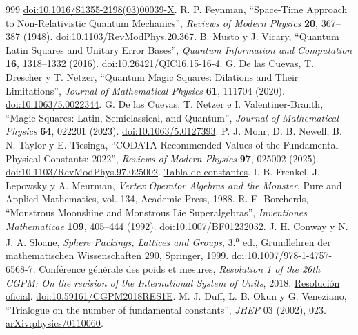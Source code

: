 \begin{thebibliography}{999}
\href{https://doi.org/10.1016/S1355-2198(03)00039-X}{doi:10.1016/S1355-2198(03)00039-X}.
 R. P. Feynman, ``Space-Time Approach to Non-Relativistic Quantum Mechanics'', \emph{Reviews of Modern Physics} \textbf{20}, 367--387 (1948). \href{https://doi.org/10.1103/RevModPhys.20.367}{doi:10.1103/RevModPhys.20.367}.
 B. Musto y J. Vicary, ``Quantum Latin Squares and Unitary Error Bases'', \emph{Quantum Information and Computation} \textbf{16}, 1318--1332 (2016). \href{https://doi.org/10.26421/QIC16.15-16-4}{doi:10.26421/QIC16.15-16-4}.
 G. De las Cuevas, T. Drescher y T. Netzer, ``Quantum Magic Squares: Dilations and Their Limitations'', \emph{Journal of Mathematical Physics} \textbf{61}, 111704 (2020). \href{https://doi.org/10.1063/5.0022344}{doi:10.1063/5.0022344}.
 G. De las Cuevas, T. Netzer e I. Valentiner-Branth, ``Magic Squares: Latin, Semiclassical, and Quantum'', \emph{Journal of Mathematical Physics} \textbf{64}, 022201 (2023). \href{https://doi.org/10.1063/5.0127393}{doi:10.1063/5.0127393}.
 P. J. Mohr, D. B. Newell, B. N. Taylor y E. Tiesinga, ``CODATA Recommended Values of the Fundamental Physical Constants: 2022'', \emph{Reviews of Modern Physics} \textbf{97}, 025002 (2025). \href{https://doi.org/10.1103/RevModPhys.97.025002}{doi:10.1103/RevModPhys.97.025002}. \href{https://physics.nist.gov/cuu/Constants/Table/allascii.txt}{Tabla de constantes}.
 I. B. Frenkel, J. Lepowsky y A. Meurman, \emph{Vertex Operator Algebras and the Monster}, Pure and Applied Mathematics, vol. 134, Academic Press, 1988.
 R. E. Borcherds, ``Monstrous Moonshine and Monstrous Lie Superalgebras'', \emph{Inventiones Mathematicae} \textbf{109}, 405--444 (1992). \href{https://doi.org/10.1007/BF01232032}{doi:10.1007/BF01232032}.
 J. H. Conway y N. J. A. Sloane, \emph{Sphere Packings, Lattices and Groups}, 3.\textsuperscript{a} ed., Grundlehren der mathematischen Wissenschaften 290, Springer, 1999. \href{https://doi.org/10.1007/978-1-4757-6568-7}{doi:10.1007/978-1-4757-6568-7}.
 Conférence générale des poids et mesures, \emph{Resolution 1 of the 26th CGPM: On the revision of the International System of Units}, 2018. \href{https://www.bipm.org/en/committees/cg/cgpm/26-2018/resolution-1}{Resolución oficial}. \href{https://doi.org/10.59161/CGPM2018RES1E}{doi:10.59161/CGPM2018RES1E}.
 M. J. Duff, L. B. Okun y G. Veneziano, ``Trialogue on the number of fundamental constants'', \emph{JHEP} 03 (2002), 023. \href{https://arxiv.org/abs/physics/0110060}{arXiv:physics/0110060}.

\end{thebibliography}
